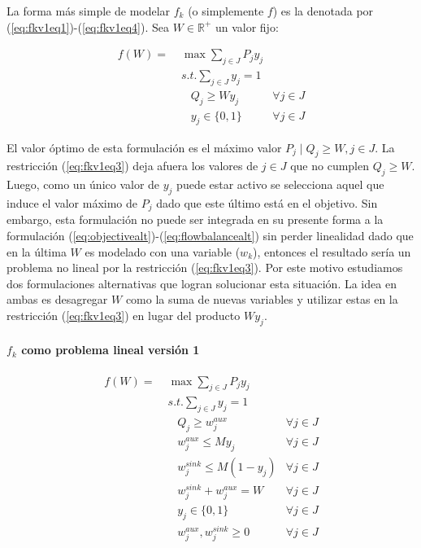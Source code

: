 La forma más simple de modelar $f_k$ (o simplemente $f$) es la denotada por (\ref{eq:fkv1eq1})-(\ref{eq:fkv1eq4}). Sea $W \in \mathbb{R}^+$ un valor fijo:

\begin{align}
  f(W) =\; & \max \sum_{j \in J} P_j y_j    & \label{eq:fkv1eq1} \\
           & s.t. \sum_{j \in J} y_j = 1   & \label{eq:fkv1eq2} \\
           & \;\;\; Q_j \geq W y_j         & \label{eq:fkv1eq3} \forall j \in J \\
           & \;\;\; y_j \in \{0,1\}        & \label{eq:fkv1eq4} \forall j \in J
\end{align}

El valor óptimo de esta formulación es el máximo valor $P_j \;|\; Q_j \geq W, j \in J$. La restricción (\ref{eq:fkv1eq3}) deja afuera los valores de $j \in J$ que no cumplen $Q_j \geq W$. Luego, como un único valor de $y_j$ puede estar activo se selecciona aquel que induce el valor máximo de $P_j$ dado que este último está en el objetivo. Sin embargo, esta formulación no puede ser integrada en su presente forma a la formulación (\ref{eq:objectivealt})-(\ref{eq:flowbalancealt}) sin perder linealidad dado que en la última $W$ es modelado con una variable ($w_k$), entonces el resultado sería un problema no lineal por la restricción (\ref{eq:fkv1eq3}). Por este motivo estudiamos dos formulaciones alternativas que logran solucionar esta situación. La idea en ambas es desagregar $W$ como la suma de nuevas variables y utilizar estas en la restricción (\ref{eq:fkv1eq3}) en lugar del producto $W y_j$.

\paragraph*{$f_k$ como problema lineal versión 1}

\begin{align}
  f(W) =\; & \max \sum_{j \in J} P_j y_j             & \label{eq:fkv3eq1}\\
           & s.t. \sum_{j \in J} y_j = 1            & \label{eq:fkv3eq2}\\
           & \;\;\; Q_j \geq w^{aux}_j              & \forall j \in J \label{eq:fkv3eq3} \\
           & \;\;\; w^{aux}_j \leq M y_j            & \forall j \in J \label{eq:fkv3eq4} \\
           & \;\;\; w^{sink}_j \leq M (1 - y_j)     & \forall j \in J \label{eq:fkv3eq5} \\
           & \;\;\; w^{sink}_j + w^{aux}_j = W      & \label{eq:fkv3eq6} \forall j \in J\\
           & \;\;\; y_j \in \{0,1\}                 & \label{eq:fkv3domainy} \forall j \in J \\
           & \;\;\; w^{aux}_j, w^{sink}_j \geq 0    & \label{eq:fkv3eq7} \forall j \in J
\end{align}

